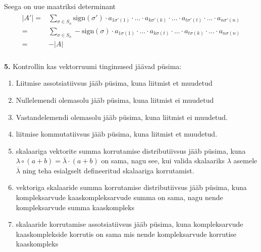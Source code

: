 \documentclass{article}
\begin{document}
Seega on uue maatriksi determinant \begin{gather*}
\begin{aligned}
|A'|=&\sum_{\sigma\in S_n}\text{sign}(\sigma')\cdot a_{1\sigma'(1)}\cdot ...\cdot a_{k\sigma'(k)}\cdot...\cdot a_{t\sigma'(t)}\cdot ...\cdot a_{n\sigma'(n)}\\
=&\sum_{\sigma\in S_n}-\text{sign}(\sigma)\cdot a_{1\sigma(1)}\cdot ...\cdot a_{k\sigma(t)}\cdot...\cdot a_{t\sigma(k)}\cdot ...\cdot a_{n\sigma(n)}\\
=&-|A|
\end{aligned}
\end{gather*}
\pagebreak\\
\textbf{5.} Kontrollin kas vektorruumi tingimused jäävad püsima:
\begin{enumerate}
\item Liitmise assotsiatiivsus jääb püsima, kuna liitmist et muudetud
\item Nullelemendi olemasolu jääb püsima, kuna liitmist ei muudetud
\item Vastandelemendi olemasolu jääb püsima, kuna liitmist ei muudetud.
\item liitmise kommutatiivsus jääb püsima, kuna liitmist et muudetud.
\item skalaariga vektorite summa korrutamise distributiivsus jääb püsima, kuna $\lambda\circ (a+b)=\overline{\lambda}\cdot (a+b)$ on sama, nagu see, kui valida skalaariks $\lambda$ asemele $\overline{\lambda}$ ning teha esialgselt defineeritud skalaariga korrutamist.
\item vektoriga skalaaride summa korrutamise distributiivsus jääb püsima, kuna kompleksarvude kaaskompleksarvude summa on sama, nagu nende kompleksarvude summa kaaskompleks
\item skalaaride korrutamise assotsiatiivsus jääb püsima, kuna kompleksarvude kaaskomplekside korrutis on sama mis nende kompleksarvude korrutise kaaskompleks
\end{enumerate}
\end{document}

